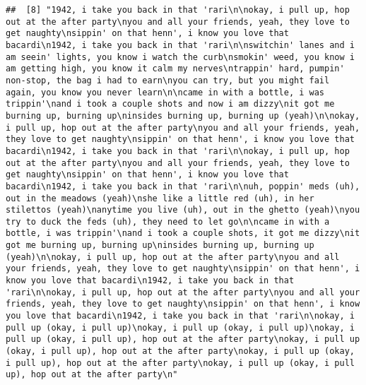 \documentclass[]{article}
\begin{document}
\begin{verbatim}
##  [8] "1942, i take you back in that 'rari\n\nokay, i pull up, hop out at the after party\nyou and all your friends, yeah, they love to get naughty\nsippin' on that henn', i know you love that bacardi\n1942, i take you back in that 'rari\n\nswitchin' lanes and i am seein' lights, you know i watch the curb\nsmokin' weed, you know i am getting high, you know it calm my nerves\ntrappin' hard, pumpin' non-stop, the bag i had to earn\nyou can try, but you might fail again, you know you never learn\n\ncame in with a bottle, i was trippin'\nand i took a couple shots and now i am dizzy\nit got me burning up, burning up\ninsides burning up, burning up (yeah)\n\nokay, i pull up, hop out at the after party\nyou and all your friends, yeah, they love to get naughty\nsippin' on that henn', i know you love that bacardi\n1942, i take you back in that 'rari\n\nokay, i pull up, hop out at the after party\nyou and all your friends, yeah, they love to get naughty\nsippin' on that henn', i know you love that bacardi\n1942, i take you back in that 'rari\n\nuh, poppin' meds (uh), out in the meadows (yeah)\nshe like a little red (uh), in her stilettos (yeah)\nanytime you live (uh), out in the ghetto (yeah)\nyou try to duck the feds (uh), they need to let go\n\ncame in with a bottle, i was trippin'\nand i took a couple shots, it got me dizzy\nit got me burning up, burning up\ninsides burning up, burning up (yeah)\n\nokay, i pull up, hop out at the after party\nyou and all your friends, yeah, they love to get naughty\nsippin' on that henn', i know you love that bacardi\n1942, i take you back in that 'rari\n\nokay, i pull up, hop out at the after party\nyou and all your friends, yeah, they love to get naughty\nsippin' on that henn', i know you love that bacardi\n1942, i take you back in that 'rari\n\nokay, i pull up (okay, i pull up)\nokay, i pull up (okay, i pull up)\nokay, i pull up (okay, i pull up), hop out at the after party\nokay, i pull up (okay, i pull up), hop out at the after party\nokay, i pull up (okay, i pull up), hop out at the after party\nokay, i pull up (okay, i pull up), hop out at the after party\n"                                                                                                                                                                                                                                                                                                                                                                                                                                                                                                                                                                                                                                                                                                                                                                                                                                                                                                                                                                                                                                                                                                                                                                                                                                     
\end{verbatim}
\end{document}
